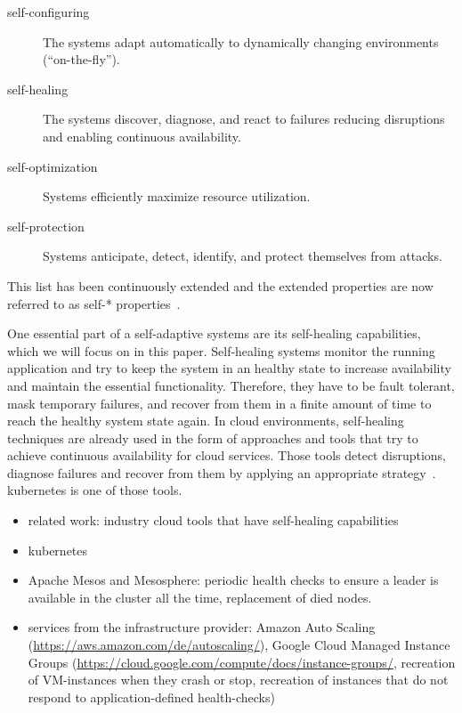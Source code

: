   \begin{description}
    \item[self-configuring] The systems adapt automatically to dynamically changing environments (\enquote{on-the-fly}).
    \item[self-healing] The systems discover, diagnose, and react to failures reducing disruptions and enabling continuous availability.
    \item[self-optimization] Systems efficiently maximize resource utilization.
    \item[self-protection] Systems anticipate, detect, identify, and protect themselves from attacks.
  \end{description}

  This list has been continuously extended and the extended properties are now referred to as self-* properties~\cite{PsaierSurvey}.

  One essential part of a self-adaptive systems are its self-healing capabilities, which we will focus on in this paper.
  Self-healing systems monitor the running application and try to keep the system in an healthy state to increase availability and maintain the essential functionality.
  Therefore, they have to be fault tolerant, mask temporary failures, and recover from them in a finite amount of time to reach the healthy system state again.
  In cloud environments, self-healing techniques are already used in the form of approaches and tools that try to achieve continuous availability for cloud services.
  Those tools detect disruptions, diagnose failures and recover from them by applying an appropriate strategy~\cite{PsaierSurvey}.
  \Gls{kubernetes} is one of those tools.

  \begin{itemize}
    \item related work: industry cloud tools that have self-healing capabilities
    \item \gls{kubernetes}
    \item Apache Mesos and Mesosphere: periodic health checks to ensure a leader is available in the cluster all the time, replacement of died nodes.
    \item services from the infrastructure provider: Amazon Auto Scaling (\url{https://aws.amazon.com/de/autoscaling/}), Google Cloud Managed Instance Groups (\url{https://cloud.google.com/compute/docs/instance-groups/}, recreation of VM-instances when they crash or stop, recreation of instances that do not respond to application-defined health-checks)
  \end{itemize}

